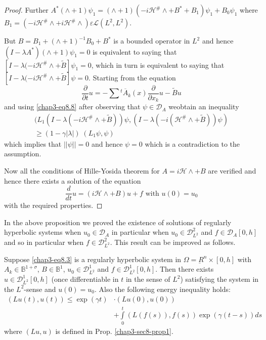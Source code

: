 \begin{proof}
Further $A^* (\wedge +1) \psi_1 = (\wedge + 1) (-i \mathscr{H}^{\#}
\wedge + B^* + B_1) \psi_1 + B_0 \psi_1$ 
where $B_1 = (-i \mathscr{H}^{\#} \wedge + i \mathscr{H}^{\#} \wedge)
\varepsilon \mathscr{L} (L^2, L^2)$. 

But $B = B_1 + (\wedge + 1)^{-1} B_0 + B^*$ is a bounded operator in
$L^2$ and hence $(I - \lambda A^*) (\wedge + 1) \psi_1 = 0$ is
equivalent to saying that $[I - \lambda (-i \mathscr{H}^{\#} \wedge +
  \tilde{B}] \psi_1 = 0$, which in turn is equivalent to saying that
$[I - \lambda (-i \mathscr{H}^{\#} \wedge + \tilde{B}] \psi =
0$. Starting from the equation 
\begin{equation*}
\frac{\partial}{\partial t} u = - \sum {}^{t}\overline{A}_k (x)
\frac{\partial}{\partial x_k} u - \tilde{B} u \tag{8.9} \label{chap3-eq8.9}
\end{equation*}
and using \eqref{chap3-eq8.8} after observing that $\psi \in \mathscr{D}_A$
we\pageoriginale obtain an inequality 
\begin{gather*}
(L_1 (I - \lambda  (- i\mathscr{H}^{\#} \wedge + \tilde{B})) \psi,
  (I - \lambda (-i(\mathscr{H}^{\#} \wedge + \tilde{B})) \psi )
  \tag{8.10}\label{chap3-eq8.10}\\ 
\geq (1 - \gamma | \lambda | ) \; (L_1 \psi, \psi )
\end{gather*}
which implies that $||\psi ||=0$ and hence $\psi = 0$ which is a
contradiction to the assumption. 

Now all the conditions of Hille-Yosida theorem for $A=i\mathscr{H}
\wedge + B$ are verified and hence there exists a solution of the
equation 
$$
\frac{d}{dt} u = (i\mathscr{H} \wedge + B) u + f \text{ with } u(0) =
u_0 
$$
with the required properties. 
\end{proof}

In the above proposition we proved the existence of solutions of
regularly hyperbolic systems when $u_0 \in \mathscr{D}_A$ in
particular when $u_0 \in \mathscr{D}^2_{L^{2}}$ and $f
\in \mathscr{D}_A [0, h]$ and so in particular when $f
\in \mathscr{D}^2_{L^{2}}$. This result can be improved as
follows. 

\begin{proposition}\label{chap3-sec8-prop2}%
Suppose \eqref{chap3-eq8.3} is a regularly hyperbolic system in $\Omega =
\underbar{R}^n \times [0, h]$ with $A_k \in \mathbb{B}^{1 +
  \sigma}$, $B \in \mathbb{B}^1$, $u_0 \in
\mathscr{D}^1_{L^{2}}$ and $f \in \mathscr{D}^1_{L^{2}} [0,
  h]$. Then there exists $u \in \mathscr{D}^1_{L^{2}} [0, h]$
(once differentiable in $t$ in the sense of $L^2$) satisfying the
system in the $L^2$-sense and $u(0) = u_0$.  
Also the following energy inequality holds:
\begin{align*}
(Lu(t), u(t)) \leq \exp (\gamma t) & \cdot  (Lu(0), u(0))\\
&  + \int \limits^t_0
  (L(f(s)), f(s)) \exp (\gamma (t-s))ds \tag{8.12} \label{chap3-eq8.12}
\end{align*}
where $(Lu, u)$ is defined in Prop. \ref{chap3-sec8-prop1}.
\end{proposition}

